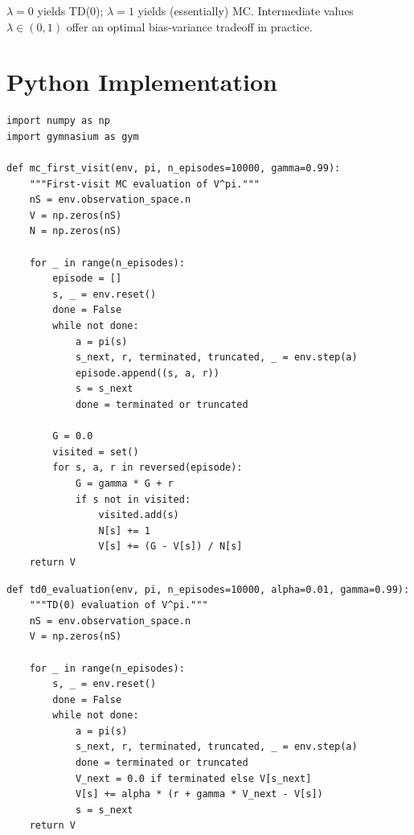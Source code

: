 \begin{remark}
$\lambda = 0$ yields TD(0); $\lambda = 1$ yields (essentially) MC. Intermediate
values $\lambda \in (0,1)$ offer an optimal bias-variance tradeoff in practice.
\end{remark}

\section{Python Implementation}

\begin{codeblock}[title=\textbf{First-Visit Monte Carlo Evaluation}]
\begin{verbatim}
import numpy as np
import gymnasium as gym

def mc_first_visit(env, pi, n_episodes=10000, gamma=0.99):
    """First-visit MC evaluation of V^pi."""
    nS = env.observation_space.n
    V = np.zeros(nS)
    N = np.zeros(nS)

    for _ in range(n_episodes):
        episode = []
        s, _ = env.reset()
        done = False
        while not done:
            a = pi(s)
            s_next, r, terminated, truncated, _ = env.step(a)
            episode.append((s, a, r))
            s = s_next
            done = terminated or truncated

        G = 0.0
        visited = set()
        for s, a, r in reversed(episode):
            G = gamma * G + r
            if s not in visited:
                visited.add(s)
                N[s] += 1
                V[s] += (G - V[s]) / N[s]
    return V
\end{verbatim}
\end{codeblock}

\begin{codeblock}[title=\textbf{TD(0) for Policy Evaluation}]
\begin{verbatim}
def td0_evaluation(env, pi, n_episodes=10000, alpha=0.01, gamma=0.99):
    """TD(0) evaluation of V^pi."""
    nS = env.observation_space.n
    V = np.zeros(nS)

    for _ in range(n_episodes):
        s, _ = env.reset()
        done = False
        while not done:
            a = pi(s)
            s_next, r, terminated, truncated, _ = env.step(a)
            done = terminated or truncated
            V_next = 0.0 if terminated else V[s_next]
            V[s] += alpha * (r + gamma * V_next - V[s])
            s = s_next
    return V
\end{verbatim}
\end{codeblock}

